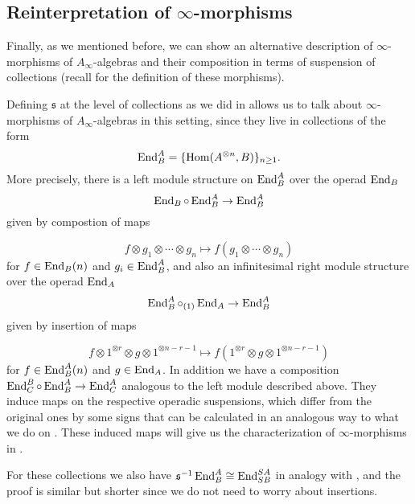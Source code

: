 \documentclass[join.tex]{subfiles}
\begin{document}
\subsection{Reinterpretation of $\infty$-morphisms}\label{reinterpretation}
Finally, as we mentioned before, we can show an alternative description of $\infty$-morphisms of $A_\infty$-algebras and their composition in terms of suspension of collections (recall  for the definition of these morphisms).

Defining $\mathfrak{s}$ at the level of collections as we did in  allows us to talk about $\infty$-morphisms of $A_\infty$-algebras in this setting, since they live in collections of the form\[\operatorname{End}^A_B=\{\operatorname{Hom}(A^{\otimes n},B)\}_{n\geq 1}.\] More precisely, there is a left module structure on $\operatorname{End}^A_B$ over the operad $\operatorname{End}_B$
\[\operatorname{End}_B\circ \operatorname{End}^A_B\to \operatorname{End}^A_B\] given by compostion of maps 

\[f\otimes g_1\otimes\cdots\otimes g_n\mapsto f(g_1\otimes\cdots\otimes g_n)\]
for $f\in\operatorname{End}_B(n)$ and $g_i\in \operatorname{End}^A_B$, and also an infinitesimal right module structure over the operad  $\operatorname{End}_A$ 
\[\operatorname{End}^A_B \circ_{(1)} \operatorname{End}_A\to \operatorname{End}^A_B\]
given by insertion of maps

\[f\otimes 1^{\otimes r}\otimes g\otimes 1^{\otimes n-r-1}\mapsto f(1^{\otimes r}\otimes g\otimes 1^{\otimes n-r-1})\] for $f\in \operatorname{End}^A_B(n)$ and $g\in \operatorname{End}_A$.  In addition we have a composition $\operatorname{End}^B_C\circ \operatorname{End}^A_B\to\operatorname{End}^A_C$ analogous to the left module described above. They induce maps on the respective operadic suspensions, which differ from the original ones by some signs that can be calculated in an analogous way to what we do on . These induced maps will give us the characterization of $\infty$-morphisms in .

For these collections we also have $\mathfrak{s}^{-1}\operatorname{End}^A_B\cong \operatorname{End}^{SA}_{SB}$ in analogy with , and the proof is similar but shorter since we do not need to worry about insertions. 
\end{document}
